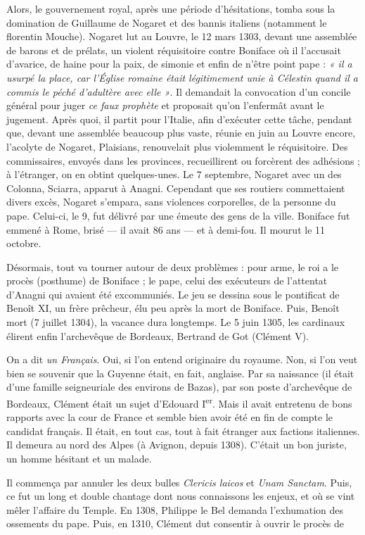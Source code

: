 \documentclass[french,twoside]{book} %
\begin{document}
Alors, le gouvernement royal, après une période d’hésitations, tomba sous la domination de Guillaume de Nogaret et des bannis italiens (notamment le florentin Mouche). Nogaret lut au Louvre, le 12 mars 1303, devant une assemblée de barons et de prélats, un violent réquisitoire contre Boniface où il l’accusait d’avarice, de haine pour la paix, de simonie et enfin de n’être point pape : \emph{« il a usurpé la place, car l’Église romaine était légitimement unie à Célestin quand il a commis le péché d’adultère avec elle »}. Il demandait la convocation d’un concile général pour juger \emph{ce faux prophète} et proposait qu’on l’enfermât avant le jugement. Après quoi, il partit pour l’Italie, afin d’exécuter cette tâche, pendant que, devant une assemblée beaucoup plus vaste, réunie en juin au Louvre encore, l’acolyte de Nogaret, Plaisians, renouvelait plus violemment le réquisitoire. Des commissaires, envoyés dans les provinces, recueillirent ou forcèrent des adhésions ; à l’étranger, on en obtint quelques-unes. Le 7 septembre, Nogaret avec un des Colonna, Sciarra, apparut à Anagni. Cependant que ses routiers commettaient divers excès, Nogaret s’empara, sans violences corporelles, de la personne du pape. Celui-ci, le 9, fut délivré par une émeute des gens de la ville. Boniface fut emmené à Rome, brisé — il avait 86 ans — et à demi-fou. Il mourut le 11 octobre.\par
Désormais, tout va tourner autour de deux problèmes : pour arme, le roi a le procès (posthume) de Boniface ; le pape, celui des exécuteurs de l’attentat d’Anagni qui avaient été excommuniés. Le jeu se dessina sous le pontificat de Benoît XI, un frère prêcheur, élu peu après la mort de Boniface. Puis, Benoît mort (7 juillet 1304), la vacance dura longtemps. Le 5 juin 1305, les cardinaux élirent enfin l’archevêque de Bordeaux, Bertrand de Got (Clément V).\par
On a dit \emph{un Français}. Oui, si l’on entend originaire du royaume. Non, si l’on veut bien se souvenir que la Guyenne était, en fait, anglaise. Par sa naissance (il était d’une famille seigneuriale des environs de Bazas), par son poste d’archevêque de Bordeaux, Clément était un sujet d’Edouard I\textsuperscript{er}. Mais il avait entretenu de bons rapports avec la cour de France et semble bien avoir été en fin de compte le candidat français. Il était, en tout cas, tout à fait étranger aux factions italiennes. Il demeura au nord des Alpes (à Avignon, depuis 1308). C’était un bon juriste, un homme hésitant et un malade.\par
Il commença par annuler les deux bulles {\itshape Clericis laicos} et {\itshape Unam Sanctam}. Puis, ce fut un long et double chantage dont nous connaissons les enjeux, et où se vint mêler l’affaire du Temple. En 1308, Philippe le Bel demanda l’exhumation des ossements du pape. Puis, en 1310, Clément dut consentir à ouvrir le procès de  
\end{document}

